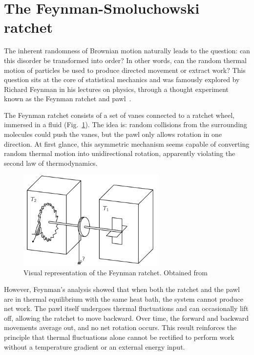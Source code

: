 \section{The Feynman-Smoluchowski ratchet}

The inherent randomness of Brownian motion naturally leads to the question: can this disorder be transformed into order? In other words, can the random thermal motion of particles be used to produce directed movement or extract work? This question sits at the core of statistical mechanics and was famously explored by Richard Feynman in his lectures on physics, through a thought experiment known as the Feynman ratchet and pawl~\cite{feynman1963feynman}.

The Feynman ratchet consists of a set of vanes connected to a ratchet wheel, immersed in a fluid (Fig.~\ref{fig:feynmanratchet}). The idea is: random collisions from the surrounding molecules could push the vanes, but the pawl only allows rotation in one direction. At first glance, this asymmetric mechanism seems capable of converting random thermal motion into unidirectional rotation, apparently violating the second law of thermodynamics.

\begin{figure}
  \begin{center}
    \includegraphics[width=0.65\textwidth]{figures/feynmanratchet.png}
  \end{center}
  \caption[Feynman ratchet]{Visual representation of the Feynman ratchet. Obtained from \cite{feynman1963feynman}}\label{fig:feynmanratchet}
\end{figure}


However, Feynman's analysis showed that when both the ratchet and the pawl are in thermal equilibrium with the same heat bath, the system cannot produce net work. The pawl itself undergoes thermal fluctuations and can occasionally lift off, allowing the ratchet to move backward. Over time, the forward and backward movements average out, and no net rotation occurs. This result reinforces the principle that thermal fluctuations alone cannot be rectified to perform work without a temperature gradient or an external energy input.

